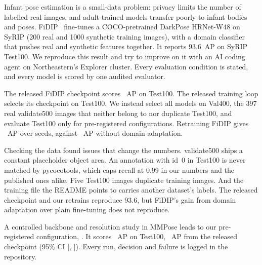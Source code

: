 Infant pose estimation is a small-data problem: privacy limits the number of labelled real images, and adult-trained models transfer poorly to infant bodies and poses.
FiDIP~\citep{huang2021fidip} fine-tunes a COCO-pretrained DarkPose HRNet-W48 on SyRIP (200 real and 1000 synthetic training images), with a domain classifier that pushes real and synthetic features together. It reports 93.6~AP on SyRIP Test100.
We reproduce this result and try to improve on it with an AI coding agent on Northeastern's Explorer cluster. Every evaluation condition is stated, and every model is scored by one audited evaluator.

The released FiDIP checkpoint scores ~AP on Test100.
The released training loop selects its checkpoint on Test100. We instead select all models on Val400, the 397 real validate500 images that neither belong to nor duplicate Test100, and evaluate Test100 only for pre-registered configurations.
Retraining FiDIP gives ~AP over  seeds, against ~AP without domain adaptation.

Checking the data found issues that change the numbers. validate500 ships a constant placeholder object area. An annotation with id~0 in Test100 is never matched by pycocotools, which caps recall at 0.99 in our numbers and the published ones alike. Five Test100 images duplicate training images. And the training file the README points to carries another dataset's labels.
The released checkpoint and our retrains reproduce 93.6, but FiDIP's gain from domain adaptation over plain fine-tuning does not reproduce.

A controlled backbone and resolution study in MMPose leads to our pre-registered configuration, . It scores ~AP on Test100, ~AP from the released checkpoint (95\% CI [, ]).
Every run, decision and failure is logged in the repository.
